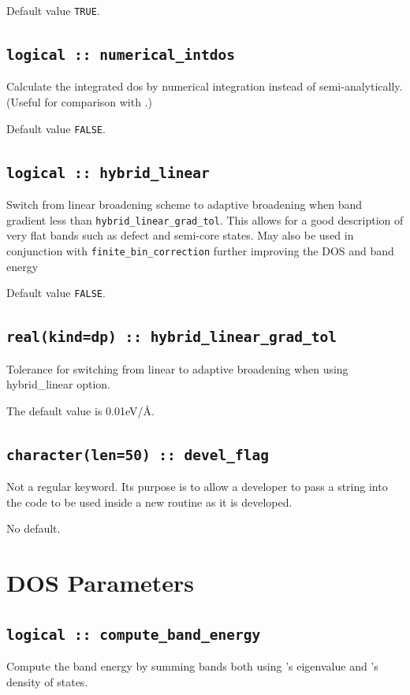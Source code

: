\documentclass[a4paper,11pt,twoside]{book}
\begin{document}
{Default value \verb#TRUE#.

\subsection[numerical\_intdos]{\tt logical :: numerical\_intdos}
Calculate the integrated dos by numerical integration instead of semi-analytically. (Useful for comparison with \lindos.)

Default value \verb#FALSE#.

\subsection[hybrid\_linear]{\tt logical :: hybrid\_linear}
Switch from linear broadening scheme to adaptive broadening when band gradient less than \verb#hybrid_linear_grad_tol#.
This allows for a good description of very flat bands such as defect and semi-core states. May also be used in conjunction
with \verb#finite_bin_correction# further improving the DOS and band energy

Default value \verb#FALSE#.

\subsection[hybrid\_linear\_grad\_tol]{\tt real(kind=dp) :: hybrid\_linear\_grad\_tol}
Tolerance for switching from linear to adaptive broadening when using hybrid\_linear option.

The default value is 0.01eV/\AA.


\subsection[devel\_flag]{\tt character(len=50) :: devel\_flag}

Not a regular keyword. Its purpose is to allow a developer to pass a
string into the code to be used inside a new routine as it is developed.

No default.



\section{DOS Parameters}

\subsection[compute\_band\_energy]{\tt logical :: compute\_band\_energy}
Compute the band energy by summing bands both using \castep's eigenvalue and \optados's density of states.

}
\end{document}
